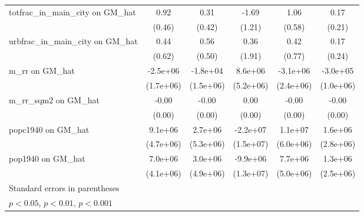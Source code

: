 \begin{table}[htbp]
\begin{tabular}{l*{5}{c}}
\addlinespace
totfrac\_in\_main\_city on GM\_hat&     0.92\sym{*}  &     0.31         &    -1.69         &     1.06         &     0.17         \\
                &   (0.46)         &   (0.42)         &   (1.21)         &   (0.58)         &   (0.21)         \\
\addlinespace
urbfrac\_in\_main\_city on GM\_hat&     0.44         &     0.56         &     0.36         &     0.42         &     0.17         \\
                &   (0.62)         &   (0.50)         &   (1.91)         &   (0.77)         &   (0.24)         \\
\addlinespace
m\_rr on GM\_hat  & -2.5e+06         & -1.8e+04         &  8.6e+06         & -3.1e+06         & -3.0e+05         \\
                &(1.7e+06)         &(1.5e+06)         &(5.2e+06)         &(2.4e+06)         &(1.0e+06)         \\
\addlinespace
m\_rr\_sqm2 on GM\_hat&    -0.00         &    -0.00         &     0.00         &    -0.00         &    -0.00         \\
                &   (0.00)         &   (0.00)         &   (0.00)         &   (0.00)         &   (0.00)         \\
\addlinespace
popc1940 on GM\_hat&  9.1e+06         &  2.7e+06         & -2.2e+07         &  1.1e+07         &  1.6e+06         \\
                &(4.7e+06)         &(5.3e+06)         &(1.5e+07)         &(6.0e+06)         &(2.8e+06)         \\
\addlinespace
pop1940 on GM\_hat&  7.0e+06         &  3.0e+06         & -9.9e+06         &  7.7e+06         &  1.3e+06         \\
                &(4.1e+06)         &(4.9e+06)         &(1.3e+07)         &(5.0e+06)         &(2.5e+06)         \\
\bottomrule
\multicolumn{6}{l}{\footnotesize Standard errors in parentheses}\\
\multicolumn{6}{l}{\footnotesize \sym{*} \(p<0.05\), \sym{**} \(p<0.01\), \sym{***} \(p<0.001\)}\\
\end{tabular}
\end{table}
